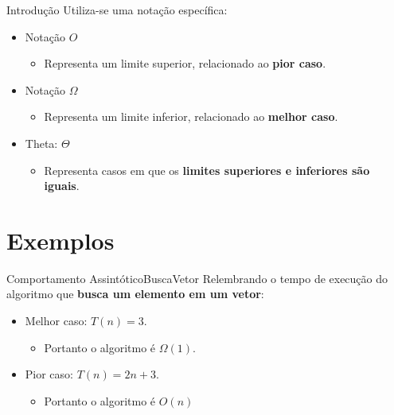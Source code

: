 \documentclass[aspectratio=169]{beamer}
\begin{document}

\begin{frame}{Introdução}
Utiliza-se uma notação específica:
\begin{itemize}
\item Notação $O$
\begin{itemize}
\item Representa um limite superior, relacionado ao {\bf pior caso}. 
\end{itemize}
\item Notação $\Omega$
\begin{itemize}
\item Representa um limite inferior, relacionado ao {\bf melhor caso}.
\end{itemize}
\item Theta: $\Theta$
\begin{itemize}
\item Representa casos em que os {\bf limites superiores e inferiores são iguais}.
\end{itemize}
\end{itemize}
\end{frame}

\section{Exemplos}

\begin{frame}{Comportamento Assintótico}{BuscaVetor}
Relembrando o tempo de execução do algoritmo que {\bf busca um elemento em um vetor}:
\begin{itemize}
\item Melhor caso: $T(n) = 3$. 
\begin{itemize}
  \item Portanto o algoritmo é $\Omega(1)$.
\end{itemize}
\item Pior caso: $T(n) = 2n + 3$. 
\begin{itemize}
 \item Portanto o algoritmo é $O(n)$
\end{itemize}
\end{itemize}
\end{frame}
\end{document}
